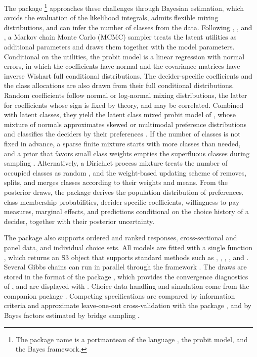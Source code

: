 \documentclass[article,shortnames]{jss}
\newcommand{\fct}[1]{\code{#1()}}
\begin{document}
The  \citep{RCoreTeam2026} package \footnote{The
package name is a portmanteau of the language , the probit model,
and the Bayes framework.} \citep{Oelschlaeger2026d} approaches these challenges
through Bayesian estimation, which avoids the evaluation of the likelihood
integrals, admits flexible mixing distributions, and can infer the number of
classes from the data. Following \citet{Albert1993}, \citet{McCulloch1994}, and
\citet{Imai2005a}, a Markov chain Monte Carlo (MCMC) sampler treats the latent
utilities as additional parameters and draws them together with the model
parameters. Conditional on the utilities, the probit model is a linear
regression with normal errors, in which the coefficients have normal and the
covariance matrices have inverse Wishart full conditional distributions. The
decider-specific coefficients and the class allocations are also drawn from
their full conditional distributions. Random coefficients follow normal or
log-normal mixing distributions, the latter for coefficients whose sign is fixed
by theory, and may be correlated. Combined with latent classes, they yield the
latent class mixed probit model of \citet{Oelschlaeger2021}, whose mixture of
normals approximates skewed or multimodal preference distributions and
classifies the deciders by their preferences \citep{Oelschlaeger2026c}. If the
number of classes is not fixed in advance, a sparse finite mixture starts with
more classes than needed, and a prior that favors small class weights empties
the superfluous classes during sampling
\citep{Rousseau2011, MalsinerWalli2016, FruehwirthSchnatter2019}. Alternatively,
a Dirichlet process mixture treats the number of occupied classes as random
\citep{Escobar1995, Neal2000}, and the weight-based updating scheme of
\citet{Oelschlaeger2021} removes, splits, and merges classes according to their
weights and means. From the posterior draws, the package derives the population
distribution of preferences, class membership probabilities, decider-specific
coefficients, willingness-to-pay measures, marginal effects, and predictions
conditional on the choice history of a decider, together with their posterior
uncertainty.

The package also supports ordered and ranked responses, cross-sectional and
panel data, and individual choice sets. All models are fitted with a single
function \fct{fit}, which returns an S3 object that supports standard methods
such as \fct{summary}, \fct{plot}, \fct{coef}, \fct{predict}, and \fct{update}.
Several Gibbs chains can run in parallel through the  framework
\citep{Bengtsson2021}. The draws are stored in the format of the 
package \citep{Buerkner2026}, which provides the convergence diagnostics of
\citet{Vehtari2021}, and are displayed with  \citep{Gabry2026}.
Choice data handling and simulation come from the companion package
 \citep{Oelschlaeger2026a}. Competing specifications are
compared by information criteria and approximate leave-one-out cross-validation
with the  package \citep{Vehtari2017, Vehtari2026}, and by Bayes
factors estimated by bridge sampling \citep{Meng1996, Gronau2020}.
\end{document}
